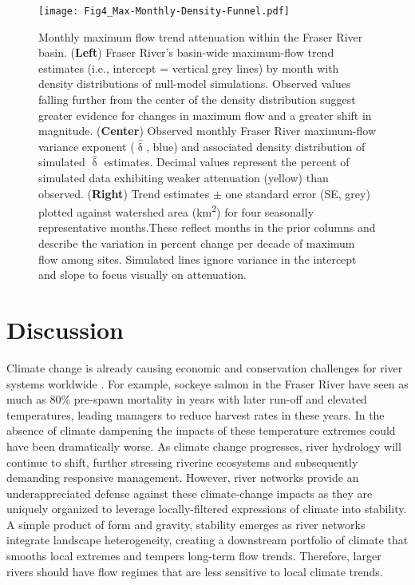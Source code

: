 \documentclass[linenumbers,draft]{AGUJournal}
\begin{document}
\begin{figure}[htp]
	\centerline{\texttt{[image: Fig4\_Max-Monthly-Density-Funnel.pdf]}}
	\caption{Monthly maximum flow trend attenuation within the Fraser River basin. (\textbf{Left}) Fraser River's basin-wide maximum-flow trend estimates (i.e., intercept = vertical grey lines) by month with density distributions of null-model simulations. Observed values falling further from the center of the density distribution suggest greater evidence for changes in maximum flow and a greater shift in magnitude. (\textbf{Center}) Observed monthly Fraser River maximum-flow variance exponent ($\hat{\updelta}$, blue) and associated density distribution of simulated $\hat{\updelta}$ estimates. Decimal values represent the percent of simulated data exhibiting weaker attenuation (yellow) than observed. (\textbf{Right}) Trend estimates $\pm$ one standard error (SE, grey) plotted against watershed area (km\textsuperscript{2}) for four seasonally representative months.These reflect months in the prior columns and describe the variation in percent change per decade of maximum flow among sites. Simulated lines ignore variance in the intercept and slope to focus visually on attenuation.}
	\label{figfour}
\end{figure}

\section{Discussion}
Climate change is already causing economic and conservation challenges for river systems worldwide \citep{Palmer:2009}. For example, sockeye salmon in the Fraser River have seen as much as 80\% pre-spawn mortality in years with later run-off and elevated temperatures, leading managers to reduce harvest rates in these years. In the absence of climate dampening the impacts of these temperature extremes could have been dramatically worse. As climate change progresses, river hydrology will continue to shift, further stressing riverine ecosystems and subsequently demanding responsive management. However, river networks provide an underappreciated defense against these climate-change impacts as they are uniquely organized to leverage locally-filtered expressions of climate into stability. A simple product of form and gravity, stability emerges as river networks integrate landscape heterogeneity, creating a downstream portfolio of climate that smooths local extremes and tempers long-term flow trends. Therefore, larger rivers should have flow regimes that are less sensitive to local climate trends.
\end{document}
